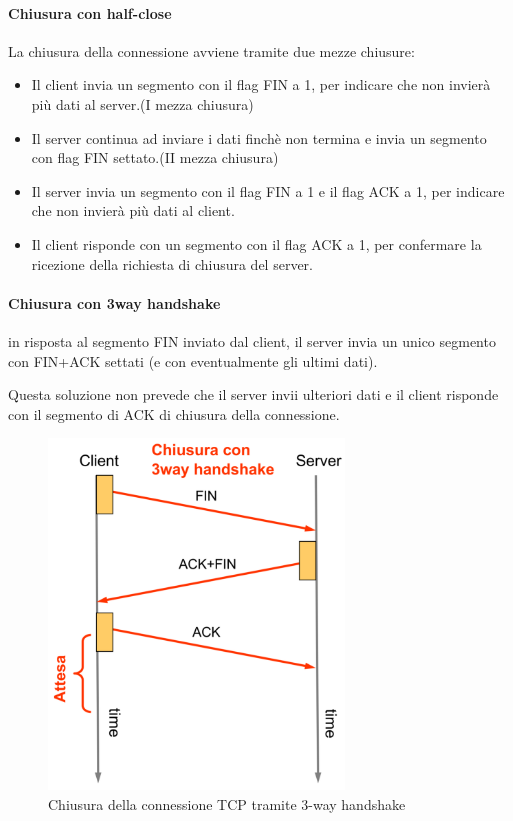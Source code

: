 \paragraph{Chiusura con half-close}
La chiusura della connessione avviene tramite due mezze chiusure:
\begin{itemize}
    \item Il client invia un segmento con il flag FIN a 1, per indicare che non invierà più dati al server.(I mezza chiusura) 
    \item Il server continua ad inviare i dati finchè non termina e invia un segmento con flag FIN settato.(II mezza chiusura)
    \item Il server invia un segmento con il flag FIN a 1 e il flag ACK a 1, per indicare che non invierà più dati al client. 
    \item Il client risponde con un segmento con il flag ACK a 1, per confermare la ricezione della richiesta di chiusura del server. 
\end{itemize} 



\paragraph{Chiusura con 3way handshake}

in risposta al segmento FIN inviato
dal client, il server invia un unico segmento con
FIN+ACK settati (e con eventualmente gli ultimi
dati).

Questa soluzione non prevede che il server invii
ulteriori dati e il client risponde con il segmento di ACK di
chiusura della connessione.

\begin{figure}[h!]
    \centering
    \includegraphics[width=0.7\textwidth]{images/3wayclose.png}
    \caption{Chiusura della connessione TCP tramite 3-way handshake}
    \label{fig:3wayclose}
\end{figure}

